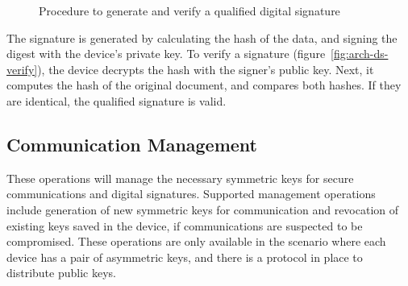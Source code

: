 \begin{figure}[h]
	\centering     %
	\caption{Procedure to generate and verify a qualified digital signature}
\end{figure}

The signature is generated by calculating the hash of the data, and signing the digest with the device's private key. To verify a signature (figure~\ref{fig:arch-ds-verify}), the device decrypts the hash with the signer's public key. Next, it computes the hash of the original document, and compares both hashes. If they are identical, the qualified signature is valid.

\subsection{Communication Management}\label{chap:arch:ops:key}

These operations will manage the necessary symmetric keys for secure communications and digital signatures.
Supported management operations include generation of new symmetric keys for communication and revocation of existing keys saved in the device, if communications are suspected to be compromised.
These operations are only available in the scenario where each device has a pair of asymmetric keys, and there is a protocol in place to distribute public keys.

